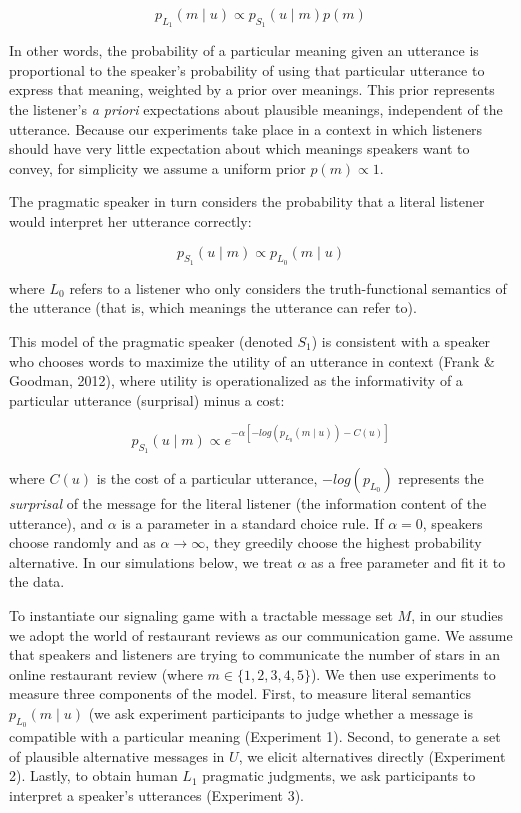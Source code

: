 \documentclass[10pt, letterpaper]{article}
\begin{document}
\[p_{L_1}(m \mid u) \propto p_{S_1} (u \mid m) p(m) \tag{1}\]

\noindent In other words, the probability of a particular meaning given
an utterance is proportional to the speaker's probability of using that
particular utterance to express that meaning, weighted by a prior over
meanings. This prior represents the listener's \emph{a priori}
expectations about plausible meanings, independent of the utterance.
Because our experiments take place in a context in which listeners
should have very little expectation about which meanings speakers want
to convey, for simplicity we assume a uniform prior \(p(m) \propto 1\).

The pragmatic speaker in turn considers the probability that a literal
listener would interpret her utterance correctly:

\[p_{S_1}(u \mid m) \propto p_{L_0} (m \mid u)\]

\noindent where \(L_0\) refers to a listener who only considers the
truth-functional semantics of the utterance (that is, which meanings the
utterance can refer to).

This model of the pragmatic speaker (denoted \(S_1\)) is consistent with
a speaker who chooses words to maximize the utility of an utterance in
context (Frank \& Goodman, 2012), where utility is operationalized as
the informativity of a particular utterance (surprisal) minus a cost:

\[p_{S_1}(u \mid m) \propto e^{-\alpha[-log(p_{L_0}(m \mid u)) - C(u)]}\]

\noindent where \(C(u)\) is the cost of a particular utterance,
\(-log(p_{L_0})\) represents the \emph{surprisal} of the message for the
literal listener (the information content of the utterance), and
\(\alpha\) is a parameter in a standard choice rule. If \(\alpha=0\),
speakers choose randomly and as \(\alpha \rightarrow \infty\), they
greedily choose the highest probability alternative. In our simulations
below, we treat \(\alpha\) as a free parameter and fit it to the data.

To instantiate our signaling game with a tractable message set \(M\), in
our studies we adopt the world of restaurant reviews as our
communication game. We assume that speakers and listeners are trying to
communicate the number of stars in an online restaurant review (where
\(m \in \{1, 2, 3, 4, 5\}\)). We then use experiments to measure three
components of the model. First, to measure literal semantics
\({p_{L_0} (m \mid u)}\) (we ask experiment participants to judge
whether a message is compatible with a particular meaning (Experiment
1). Second, to generate a set of plausible alternative messages in
\(U\), we elicit alternatives directly (Experiment 2). Lastly, to obtain
human \(L_1\) pragmatic judgments, we ask participants to interpret a
speaker's utterances (Experiment 3).
\end{document}

